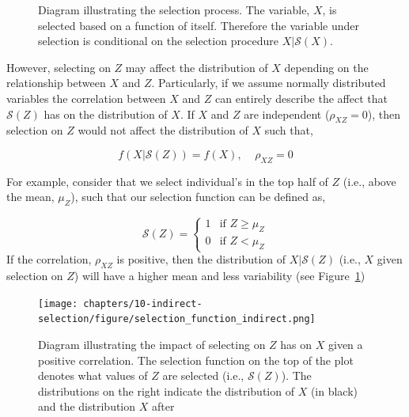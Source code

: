 \documentclass[
  letterpaper,
  DIV=11,
  numbers=noendperiod]{scrreprt}
\begin{document}
\begin{figure}[H]


\caption{\label{fig-indirect-select-diag}Diagram illustrating the
selection process. The variable, \(X\), is selected based on a function
of itself. Therefore the variable under selection is conditional on the
selection procedure \(X|\mathcal{S}(X)\).}

\end{figure}%

However, selecting on \(Z\) may affect the distribution of \(X\)
depending on the relationship between \(X\) and \(Z\). Particularly, if
we assume normally distributed variables the correlation between \(X\)
and \(Z\) can entirely describe the affect that \(\mathcal{S}(Z)\) has
on the distribution of \(X\). If \(X\) and \(Z\) are independent
(\(\rho_{XZ}=0\)), then selection on \(Z\) would not affect the
distribution of \(X\) such that,

\[
f(X|\mathcal{S}(Z)) = f(X),\;\;\;\; \rho_{XZ}= 0
\]

For example, consider that we select individual's in the top half of
\(Z\) (i.e., above the mean, \(\mu_{Z}\)), such that our selection
function can be defined as,

\[\mathcal{S}(Z) = \begin{cases}1 & \text{if }Z\geq\mu_{Z}\\ 0 & \text{if }Z<\mu_{Z} \end{cases}\]
If the correlation, \(\rho_{XZ}\) is positive, then the distribution of
\(X|\mathcal{S}(Z)\) (i.e., \(X\) given selection on \(Z\)) will have a
higher mean and less variability (see
Figure~\ref{fig-indirect-select-diag})

\begin{figure}[H]

{\centering \texttt{[image: chapters/10-indirect-selection/figure/selection\_function\_indirect.png]}

}

\caption{Diagram illustrating the impact of selecting on \(Z\) has on
\(X\) given a positive correlation. The selection function on the top of
the plot denotes what values of \(Z\) are selected (i.e.,
\(\mathcal{S}(Z)\)). The distributions on the right indicate the
distribution of \(X\) (in black) and the distribution \(X\) after}

\end{figure}%
\end{document}
